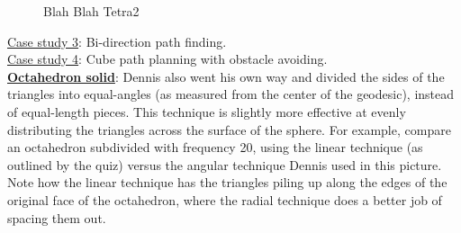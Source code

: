 \begin{center}
\begin{figure}[h]
\hfill
{}
\caption{Blah Blah Tetra2}
\end{figure}
\end{center}

\noindent\uline{Case study 3}: Bi-direction path finding.\\

\noindent\uline{Case study 4}: Cube path planning with obstacle avoiding.\\

\noindent\uline{\textbf{Octahedron solid}}:
Dennis also went his own way and divided the sides of the triangles into equal-angles (as measured from the center of the geodesic), instead of equal-length pieces. This technique is slightly more effective at evenly distributing the triangles across the surface of the sphere. For example, compare an octahedron subdivided with frequency 20, using the linear technique (as outlined by the quiz) versus the angular technique Dennis used in this picture. Note how the linear technique has the triangles piling up along the edges of the original face of the octahedron, where the radial technique does a better job of spacing them out.\\

